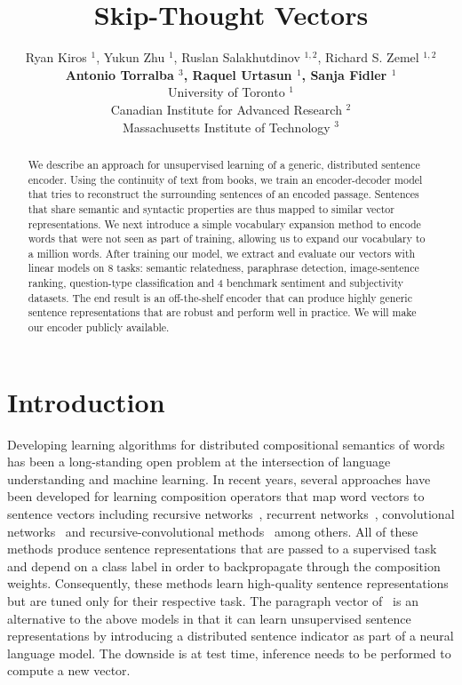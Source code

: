 \documentclass{article} \usepackage{nips15submit_e,times}
\title{Skip-Thought Vectors}
\author{
Ryan Kiros $^1$, Yukun Zhu $^1$, Ruslan Salakhutdinov $^{1,2}$, Richard S. Zemel $^{1,2}$ \\ {\bf Antonio Torralba $^3$,  Raquel Urtasun $^1$, Sanja Fidler $^1$} \\
University of Toronto $^1$ \\
Canadian Institute for Advanced Research $^2$ \\
Massachusetts Institute of Technology $^3$ \\
}
\begin{document}
\maketitle

\begin{abstract}
We describe an approach for unsupervised learning of a generic, distributed sentence encoder. Using the continuity of text from books, we train an encoder-decoder model that tries to reconstruct the surrounding sentences of an encoded passage. Sentences that share semantic and syntactic properties are thus mapped to similar vector representations. We next introduce a simple vocabulary expansion method to encode words that were not seen as part of training, allowing us to expand our vocabulary to a million words. After training our model, we extract and evaluate our vectors with linear models on 8 tasks: semantic relatedness, paraphrase detection, image-sentence ranking, question-type classification and 4 benchmark sentiment and subjectivity datasets. The end result is an off-the-shelf encoder that can produce highly generic sentence representations that are robust and perform well in practice. We will make our encoder publicly available. 
\end{abstract}

\section{Introduction}

Developing learning algorithms for distributed compositional semantics of words has been a long-standing open problem at the intersection of language understanding and machine learning. In recent years, several approaches have been developed for learning composition operators that map word vectors to sentence vectors including recursive networks~\cite{socher2013recursive}, recurrent networks~\cite{hochreiter1997long}, convolutional networks~\cite{kalchbrenner2014convolutional, kim2014convolutional} and recursive-convolutional methods~\cite{cho2014properties, zhao2015self} among others. All of these methods produce sentence representations that are passed to a supervised task and depend on a class label in order to backpropagate through the composition weights. Consequently, these methods learn high-quality sentence representations but are tuned only for their respective task. The paragraph vector of~\cite{le2014distributed} is an alternative to the above models in that it can learn unsupervised sentence representations by introducing a distributed sentence indicator as part of a neural language model. The downside is at test time, inference needs to be performed to compute a new vector.
\end{document}
